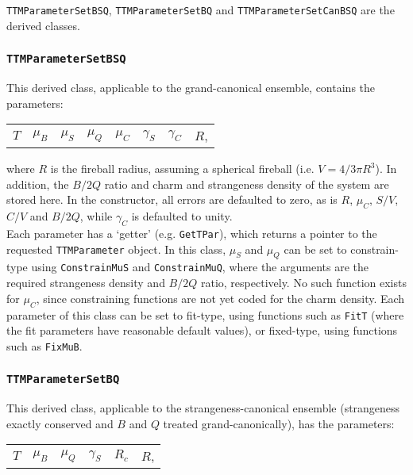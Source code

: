 \documentclass{elsarticle}
\begin{document}
\texttt{TTMParameterSetBSQ}, \texttt{TTMParameterSetBQ} and \texttt{TTMParameterSetCanBSQ} are the derived classes.\\ 

\subsubsection{\texttt{TTMParameterSetBSQ}}
This derived class, applicable to the grand-canonical ensemble, contains the parameters:\\

\begin{center}
\begin{tabular}{cccccccc}
$T$ & $\mu_B$ & $\mu_S$ & $\mu_Q$ & $\mu_C$ & $\gamma_S$ & $\gamma_C$ & $R$,\\
\end{tabular}
\end{center}

\noindent
where $R$ is the fireball radius, assuming a spherical fireball (i.e. $V=4/3\pi R^3$). 
In addition, the $B/2Q$ ratio and charm and strangeness density of the 
system are stored here. In the constructor, all errors are defaulted to zero, as is $R$, $\mu_C$, $S/V$, 
$C/V$ and $B/2Q$, while $\gamma_C$ is defaulted to unity.\\ 

Each parameter has a `getter' (e.g. \texttt{GetTPar}), which returns a pointer to the requested  
\texttt{TTMParameter} object. In this class, 
$\mu_S$ and $\mu_Q$ can be set to constrain-type using \texttt{ConstrainMuS} and 
\texttt{ConstrainMuQ}, where the arguments are the required strangeness density and 
$B/2Q$ ratio, respectively. No such function exists for $\mu_C$, since constraining functions 
are not yet coded for the charm density. Each parameter of this class can be set to 
fit-type, using functions such as \texttt{FitT} (where the fit parameters have reasonable 
default values), or fixed-type, using functions such as \texttt{FixMuB}.
  
\subsubsection{\texttt{TTMParameterSetBQ}}
This derived class, applicable to the strangeness-canonical ensemble (strangeness exactly conserved and 
$B$ and $Q$ treated grand-canonically), has the parameters:\\
\begin{center}
\begin{tabular}{cccccc}
$T$ & $\mu_B$ & $\mu_Q$ & $\gamma_S$ & $R_c$ & $R$,\\
\end{tabular}
\end{center}
\end{document}
